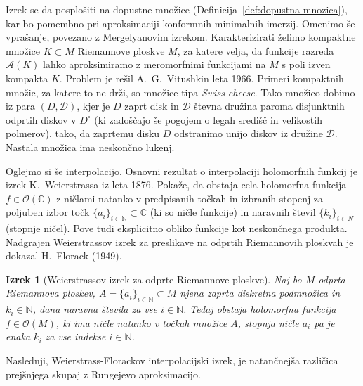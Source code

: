 \documentclass[12pt,a4paper,twoside]{article}
\theoremstyle{definition} %
\theoremstyle{plain} %
\newtheorem{izrek}[definicija]{Izrek}
\numberwithin{equation}{section}  %
\newcommand{\N}{\mathbb N}
\newcommand{\C}{\mathbb C}
\begin{document}
Izrek se da posplošiti na dopustne množice (Definicija~\ref{def:dopustna-mnozica}), kar bo pomembno pri aproksimaciji konformnih minimalnih imerzij. \newline
Omenimo še vprašanje, povezano z Mergelyanovim izrekom. Karakterizirati želimo kompaktne množice $K \subset M$ Riemannove ploskve $M$, za katere velja, da funkcije razreda $\mathcal{A}(K)$ lahko aproksimiramo z meromorfnimi funkcijami na $M$ s poli izven kompakta $K$. Problem je rešil A.~G.~Vitushkin leta 1966. Primeri kompaktnih množic, za katere to ne drži, so množice tipa \emph{Swiss cheese}. Tako množico dobimo iz para $(D, \mathcal{D})$, kjer je $D$ zaprt disk in $\mathcal{D}$ števna družina paroma disjunktnih odprtih diskov v $D^{\circ}$ (ki zadoščajo še pogojem o legah središč in velikostih polmerov), tako, da zaprtemu disku $D$ odstranimo unijo diskov iz družine $\mathcal{D}$. Nastala množica ima neskončno lukenj. \newline

Oglejmo si še interpolacijo.
Osnovni rezultat o interpolaciji holomorfnih funkcij je izrek K.~Weierstrassa iz leta 1876. Pokaže, da obstaja cela holomorfna funkcija $f \in \mathcal{O}(\C)$ z ničlami natanko v predpisanih točkah in izbranih stopenj za poljuben izbor točk $\{ a_{i} \}_{i \in \N} \subset \C$ (ki so ničle funkcije) in naravnih števil $\{ k_{i} \}_{i \in N}$ (stopnje ničel). Pove tudi eksplicitno obliko funkcije kot neskončnega produkta.
Nadgrajen Weierstrassov izrek za preslikave na odprtih Riemannovih ploskvah je dokazal H.~Florack (1949).

\begin{izrek} [Weierstrassov izrek za odprte Riemannove ploskve] \label{izr:Weierstrass}
Naj bo $M$ odprta Riemannova ploskev, $A = \{a_{i}\}_{i \in \N} \subset M$ njena zaprta diskretna podmnožica in $k_{i} \in \N$, dana naravna števila za vse $i \in \N$.
Tedaj obstaja holomorfna funkcija $f \in \mathcal{O}(M)$, ki ima ničle natanko v točkah množice $A$, stopnja ničle $a_{i}$ pa je enaka $k_{i}$ za vse indekse $i \in \N$.
\end{izrek}

Naslednji, Weierstrass-Florackov interpolacijski izrek, je natančnejša različica prejšnjega skupaj z Rungejevo aproksimacijo.
\end{document}
